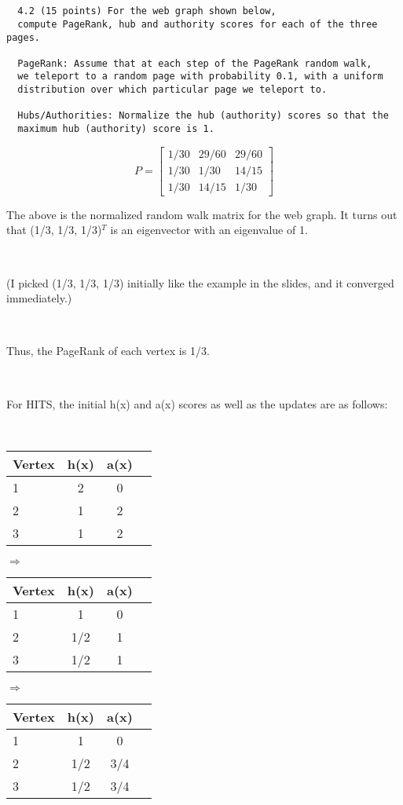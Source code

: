 \documentclass[12pt]{article}
\newcommand{\mt}[1]{\ensuremath{#1}}
\newcommand{\rar}{ \mt{\Rightarrow} }     %
\begin{document}
\

\

\begin{verbatim}
  4.2 (15 points) For the web graph shown below,
  compute PageRank, hub and authority scores for each of the three pages.
  
  PageRank: Assume that at each step of the PageRank random walk, 
  we teleport to a random page with probability 0.1, with a uniform 
  distribution over which particular page we teleport to.

  Hubs/Authorities: Normalize the hub (authority) scores so that the
  maximum hub (authority) score is 1.
\end{verbatim}

\begin{displaymath}
    P = \begin{bmatrix}
     1/30 & 29/60 & 29/60 \\
     1/30 & 1/30 & 14/15 \\
     1/30 & 14/15 & 1/30  
  \end{bmatrix}
\end{displaymath}

The above is the normalized random walk matrix for the web graph. It turns out that (1/3, 1/3, 1/3)$^T$ is an eigenvector with an eigenvalue of 1.

\

(I picked (1/3, 1/3, 1/3) initially like the example in the slides, and it converged immediately.)

\

 Thus, the PageRank of each vertex is 1/3.
 
 \
 
 For HITS, the initial h(x) and a(x) scores as well as the updates are as follows:
 
 \
 
\begin{tabular}{l|ccc}
  Vertex & h(x) & a(x) \\
  \hline
  1 & 2 & 0 \\
  2 & 1 & 2 \\
  3 & 1 & 2
\end{tabular} \rar 
\begin{tabular}{l|ccc}
  Vertex & h(x) & a(x) \\
  \hline
  1 & 1 & 0 \\
  2 & 1/2 & 1 \\
  3 & 1/2 & 1
\end{tabular} \rar
\begin{tabular}{l|ccc}
  Vertex & h(x) & a(x) \\
  \hline
  1 & 1 & 0 \\
  2 & 1/2 & 3/4 \\
  3 & 1/2 & 3/4
\end{tabular}
\end{document}
